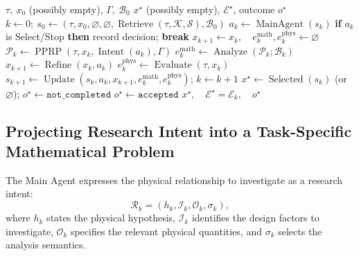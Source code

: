 \begin{algorithm}[!t]
\caption{Main-Agent-directed research and structure--control co-design}
\label{alg:agent-research}
\fontsize{9}{11}\selectfont
\begin{algorithmic}[1]
\Require $\tau,\ x_0$ (possibly empty), $\Gamma,\ \mathcal B_0$
\Ensure $x^\star$ (possibly empty), $\mathcal E^\star$, outcome $o^\star$
\State $k\gets0;\ s_0\gets(\tau,x_0,\varnothing,\varnothing,\operatorname{Retrieve}(\tau,\mathcal K,\mathcal S),\mathcal B_0)$
  \State $a_k\gets\operatorname{MainAgent}(s_k)$
  \State \textbf{if} $a_k$ is Select/Stop \textbf{then} record decision; \textbf{break}
  \State $x_{k+1}\gets x_k,\quad e_k^{\mathrm{math}},e_k^{\mathrm{phys}}\gets\varnothing$
    \State $\mathcal P_k\gets\operatorname{PPRP}(\tau,x_k,\operatorname{Intent}(a_k),\Gamma)$
    \State $e_k^{\mathrm{math}}\gets\operatorname{Analyze}(\mathcal P_k;\mathcal B_k)$
    \State $x_{k+1}\gets\operatorname{Refine}(x_k,a_k)$
    \State $e_k^{\mathrm{phys}}\gets\operatorname{Evaluate}(\tau,x_k)$
  \EndIf
  \State $s_{k+1}\gets\operatorname{Update}(s_k,a_k,x_{k+1},e_k^{\mathrm{math}},e_k^{\mathrm{phys}})$; $k\gets k+1$
\EndWhile
\State $x^\star\gets\operatorname{Selected}(s_k)$ (or $\varnothing$); $o^\star\gets\texttt{not\_completed}$
  \State $o^\star\gets\texttt{accepted}$
\EndIf
\State \Return $x^\star,\quad\mathcal E^\star=\mathcal E_k,\quad o^\star$
\end{algorithmic}
\end{algorithm}

\subsection{Projecting Research Intent into a Task-Specific Mathematical Problem}
\label{subsec:pprp}

The Main Agent expresses the physical relationship to investigate as a research intent:
\begin{equation}
\mathcal R_k=(h_k,\mathcal I_k,\mathcal O_k,\sigma_k),
\label{eq:research-intent}
\end{equation}
where $h_k$ states the physical hypothesis, $\mathcal I_k$ identifies the design factors to investigate, $\mathcal O_k$ specifies the relevant physical quantities, and $\sigma_k$ selects the analysis semantics.

